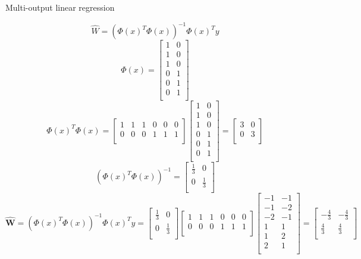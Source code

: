 \documentclass[draft]{exam} %
\theoremstyle{definition} \newtheorem*{defn}{Definition}
\begin{document}
\begin{questions}
 Multi-output linear regression \\

\begin{solution}  %
$$\hat{W} = (\Phi(x)^T \Phi(x))^{-1}\Phi(x)^T y$$
\[
\Phi(x) =
\begin{bmatrix}
1 & 0 \\
1 & 0 \\
1 & 0 \\
0 & 1 \\
0 & 1 \\
0 & 1 \\
\end{bmatrix}
\]
\[
\Phi(x)^T \Phi(x) =
\begin{bmatrix}
1 & 1 & 1 & 0 & 0 & 0 \\
0 & 0 & 0 & 1 & 1 & 1 \\
\end{bmatrix}
\begin{bmatrix}
1 & 0 \\
1 & 0 \\
1 & 0 \\
0 & 1 \\
0 & 1 \\
0 & 1 \\
\end{bmatrix}
=
\begin{bmatrix}
3 & 0 \\
0 & 3 \\
\end{bmatrix}
\]
\[
(\Phi(x)^T \Phi(x))^{-1} =
\begin{bmatrix}
\frac{1}{3} & 0 \\
0 & \frac{1}{3} \\
\end{bmatrix}
\]
\[
\pmb{\hat{W}} = (\Phi(x)^T \Phi(x))^{-1} \Phi(x)^T y =
\begin{bmatrix}
\frac{1}{3} & 0 \\
0 & \frac{1}{3} \\
\end{bmatrix}
\begin{bmatrix}
1 & 1 & 1 & 0 & 0 & 0 \\
0 & 0 & 0 & 1 & 1 & 1 \\
\end{bmatrix}
\begin{bmatrix}
-1 & -1 \\
-1 & -2 \\
-2 & -1 \\
1 & 1 \\
1 & 2 \\
2 & 1 \\
\end{bmatrix}
=
\begin{bmatrix}
-\frac{4}{3} & -\frac{4}{3} \\
\frac{4}{3} & \frac{4}{3} \\
\end{bmatrix}
\]
\end{solution}


\end{questions}
\end{document}
